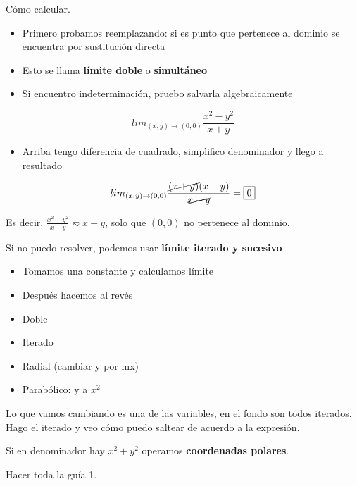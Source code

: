 Cómo calcular.
\begin{itemize}
    \item Primero probamos reemplazando: si es punto que pertenece al dominio
    se encuentra por sustitución directa
    \item Esto se llama \textbf{límite doble} o \textbf{simultáneo}
    \item Si encuentro indeterminación, pruebo salvarla algebraicamente
\end{itemize}

\begin{equation*}
    lim_{(x,y) \to (0,0)} \frac{x^{2} - y^{2}}{x + y}
\end{equation*}

\begin{itemize}
    \item Arriba tengo diferencia de cuadrado, simplifico denominador y 
    llego a resultado
\end{itemize}

\begin{equation*}
    lim_{(x,y) \to (0,0)} \frac{\cancel{(x + y)}(x - y)}{\cancel{x + y}} = \boxed{0}
\end{equation*}

Es decir, \(\frac{x^{2} - y^{2}}{x + y} \eqsim x - y\), solo que \((0,0)\) 
no pertenece al dominio.

Si no puedo resolver, podemos usar \textbf{límite iterado y sucesivo}
\begin{itemize}
    \item Tomamos una constante y calculamos límite 
    \item Después hacemos al revés
\end{itemize}

\begin{itemize}
    \item Doble
    \item Iterado 
    \item Radial (cambiar y por mx)
    \item Parabólico: y a \(x^{2}\)
\end{itemize}

Lo que vamos cambiando es una de las variables, en el fondo son todos iterados.
Hago el iterado y veo cómo puedo saltear de acuerdo a la expresión.

Si en denominador hay \(x^{2} + y^{2}\) operamos \textbf{coordenadas polares}.

Hacer toda la guía 1.